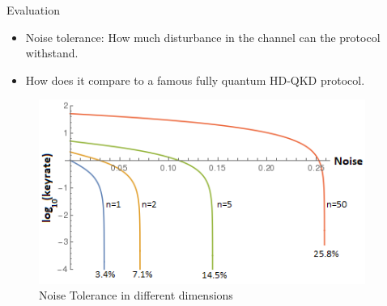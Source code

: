 \documentclass[final]{beamer}
\newlength{\sepwid}
\newlength{\onecolwid}
\newlength{\twocolwid}
\begin{document}
\begin{frame}[t]
\begin{columns}[t]
\begin{column}{\twocolwid}
\begin{columns}[t,totalwidth=\twocolwid]
\begin{column}{\onecolwid}

\begin{block}{Evaluation}

\begin{itemize}
\item Noise tolerance: How much disturbance in the channel can the protocol withstand. 
\item How does it compare to a famous fully quantum HD-QKD protocol.
\end{itemize}
\begin{figure}
	\includegraphics[width=.9\linewidth]{keyrate-ind.png}
	\caption{Noise Tolerance in different dimensions}
	\end{figure}




\end{block}


\end{column} %

\end{columns} %

\end{column} %

\begin{column}{\sepwid}\end{column} %


\end{columns}
\end{frame}
\end{document}
